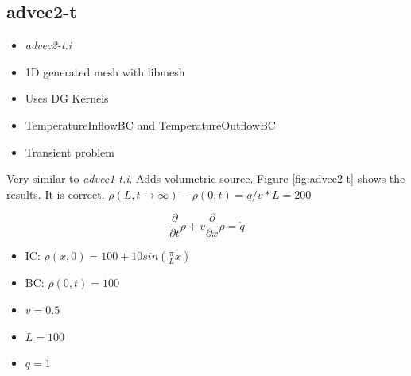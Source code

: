 \documentclass[11pt,letterpaper]{article}
\begin{document}
	\subsection{advec2-t}

	\begin{itemize}
		\item \textit{advec2-t.i}
		\item 1D generated mesh with libmesh
		\item Uses DG Kernels
		\item TemperatureInflowBC and TemperatureOutflowBC
		\item Transient problem
	\end{itemize}

    Very similar to \textit{advec1-t.i}.
    Adds volumetric source.
    Figure \ref{fig:advec2-t} shows the results.
    It is correct. $\rho(L, t \rightarrow \infty) - \rho(0, t) = q/v*L = 200$

	\begin{equation}
    \frac{\partial}{\partial t}\rho + v \frac{\partial}{\partial x} \rho = \dot{q}
	\end{equation}

	\begin{itemize}
		\item IC: $\rho(x, 0) = 100 + 10 sin(\frac{\pi}{L} x)$
		\item BC: $\rho(0, t) = 100$
		\item $v = 0.5$
		\item $L = 100$
		\item $q = 1$
	\end{itemize}
\end{document}
